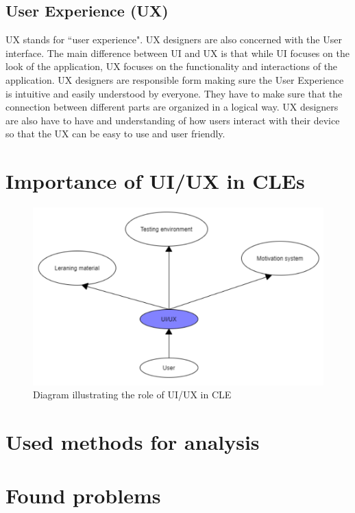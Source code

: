 \documentclass[10pt,twoside,english,a4paper]{article}
\begin{document}
\subsection{User Experience (UX)}
UX stands for ``user experience". UX designers are also concerned with the User interface. \cite{theymakedesign_2019_what}
The main difference between UI and UX is that while UI focuses on the look of the application,
UX focuses on the functionality and interactions of the application. UX designers are 
responsible form making sure the User Experience is intuitive and easily understood by everyone.
They have to make sure that the connection between different parts are organized in a logical way.
UX designers are also have to have and understanding of how users interact with their
device so that the UX can be easy to use and user friendly. \cite{theymakedesign_2019_what}

\section{Importance of UI/UX in CLEs}

\begin{figure}
    \includegraphics[width=1\textwidth]{images/diagram-crop.pdf}
    \caption{Diagram illustrating the role of UI/UX in CLE}
\end{figure}


\section{Used methods for analysis}

\section{Found problems}
\end{document}
